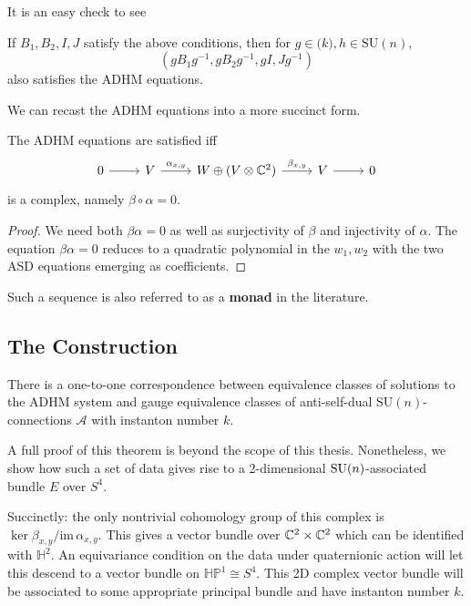 	It is an easy check to see
	\begin{obs}
		If $B_1, B_2, I, J$ satisfy the above conditions, then for $g \in \mathrm(k), h \in \mathrm{SU}(n)$, 
		\[
			(g B_1 g^{-1}, g B_2 g^{-1}, gI, Jg^{-1})
		\]
		also satisfies the ADHM equations.
	\end{obs}
	
	We can recast the ADHM equations into a more succinct form.
	\begin{prop}
		The ADHM equations are satisfied iff
		\[
		\begin{tikzcd}
			0 \arrow[r]&V \arrow[r,"\alpha_{x,y}"] & W \oplus (V \otimes \cc^2) \arrow[r,"\beta_{x,y}"] & V \arrow[r] & 0
		\end{tikzcd}
		\]
		is a complex, namely $\beta \circ \alpha = 0$.
	\end{prop}
	\begin{proof}
		We need both $\beta \alpha = 0$ as well as surjectivity of $\beta$ and injectivity of $\alpha$. The equation $\beta \alpha = 0$ reduces to a quadratic polynomial in the $w_1, w_2$ with the two ASD equations emerging as coefficients.
	\end{proof}
	
	Such a sequence is also referred to as a \textbf{monad} in the literature.
	
	
	\subsection{The Construction} %
	\label{sub:the_construction}
	
	\begin{theorem}
		There is a one-to-one correspondence between equivalence classes of solutions to the ADHM system and gauge equivalence classes of anti-self-dual $\mathrm{SU}(n)$-connections $\mathcal A$ with instanton number $k$.
	\end{theorem}
	
	A full proof of this theorem is beyond the scope of this thesis. Nonetheless, we show how such a set of data gives rise to a 2-dimensional $\mathrm{SU}(n)$-associated bundle $E$ over $S^4$. 
	
	Succinctly: the only nontrivial cohomology group of this complex is $\ker \beta_{x,y}/ \mathrm{im}\, \alpha_{x,y}$. This gives a vector bundle over $\mathbb{C}^2 \times \mathbb{C}^2$ which can be identified with $\mathbb H^2$. An equivariance condition on the data under quaternionic action will let this descend to a vector bundle on $\mathbb{HP}^1 \cong S^4$. This 2D complex vector bundle will be associated to some appropriate principal bundle and have instanton number $k$.
	
